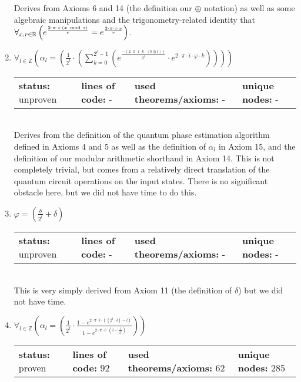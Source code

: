 \documentclass{article}[12pt]
\begin{document}
\begin{enumerate}
  Derives from Axioms 6 and 14 (the definition our $\oplus$ notation) as well as some algebraic manipulations and the trigonometry-related identity that
  $\forall_{x, r \in \mathbb{R}} \left(e^{\frac{2 \cdot \pi \cdot i \cdot \left(x ~\rm{mod}~ r\right)}{r}} = e^{\frac{2 \cdot \pi \cdot i \cdot x}{r}}\right)$.
\item $\forall_{l \in \mathbb{Z}} \left(\alpha_{l} = \left(\frac{1}{2^{t}} \cdot \left(\sum_{k=0}^{2^{t} - 1} \left(e^{\frac{-\left(2 \cdot \pi \cdot i \cdot k \cdot \left(b \oplus l\right)\right)}{2^{t}}} \cdot e^{2 \cdot \pi \cdot i \cdot \varphi \cdot k}\right)\right)\right)\right)$ \hfill \\
  \begin{tabular}{l | l | l | l}
    \textbf{status:} unproven & \textbf{lines of code:} - & \textbf{used theorems/axioms:} - & \textbf{unique nodes:} -    
  \end{tabular} \hfill \\
Derives from the definition of the quantum phase estimation algorithm defined in Axioms 4 and 5 as well as the definition of $\alpha_l$ in Axiom 15, and the definition of our modular arithmetic shorthand in Axiom 14.  This is not completely trivial, but comes from a relatively direct translation of the quantum circuit operations on the input states.  There is no significant obstacle here, but we did not have time to do this.
\item $\varphi = \left(\frac{b}{2^{t}} + \delta\right)$ \hfill \\
  \begin{tabular}{l | l | l | l}
    \textbf{status:} unproven & \textbf{lines of code:} - & \textbf{used theorems/axioms:} - & \textbf{unique nodes:} -        
  \end{tabular} \hfill \\
This is very simply derived from Axiom 11 (the definition of $\delta$) but we did not have time.
\item $\forall_{l \in \mathbb{Z}} \left(\alpha_{l} = \left(\frac{1}{2^{t}} \cdot \frac{1 - e^{2 \cdot \pi \cdot i \cdot \left(\left(2^{t} \cdot \delta\right) - l\right)}}{1 - e^{2 \cdot \pi \cdot i \cdot \left(\delta - \frac{l}{2^{t}}\right)}}\right)\right)$ \hfill \\
  \begin{tabular}{l | l | l | l}
    \textbf{status:} proven & \textbf{lines of code:} 92 & \textbf{used theorems/axioms:} 62 & \textbf{unique nodes:} 285
  \end{tabular} \hfill \\

\end{enumerate}
\end{document}

